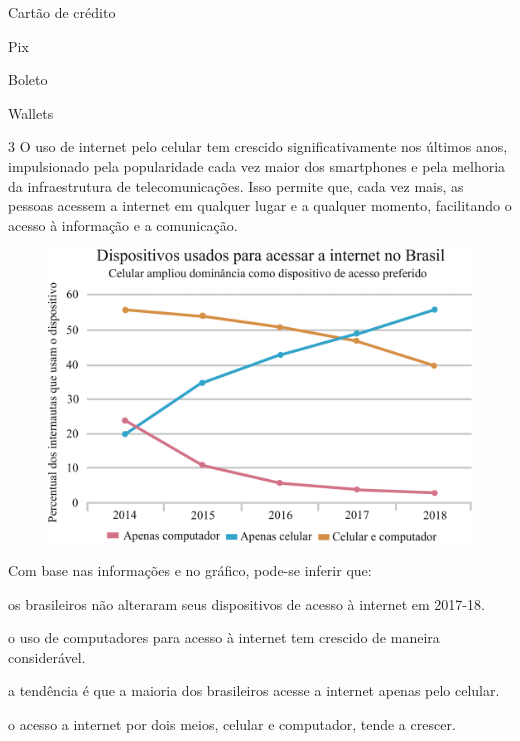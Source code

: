 \begin{escolha}
  \item Cartão de crédito

  \item Pix

  \item Boleto

  \item Wallets
\end{escolha}

\pagebreak
\num{3} O uso de internet pelo celular tem crescido significativamente nos
últimos anos, impulsionado pela popularidade cada vez maior dos
smartphones e pela melhoria da infraestrutura de telecomunicações. Isso
permite que, cada vez mais, as pessoas acessem a internet em qualquer lugar e a qualquer
momento, facilitando o acesso à informação e a comunicação.

\begin{figure}[htpb!]
\centering
\includegraphics[width=\textwidth]{./ilustras-mat/modulo_13_-treino_3.png}
\end{figure}


Com base nas informações e no gráfico, pode-se inferir que:

\begin{escolha}

  \item os brasileiros não alteraram seus dispositivos de acesso à internet em 2017-18.

  \item o uso de computadores para acesso à internet tem crescido de maneira considerável.

  \item a tendência é que a maioria dos brasileiros acesse a internet apenas pelo celular.

  \item o acesso a internet por dois meios, celular e computador, tende a crescer.

\end{escolha}


